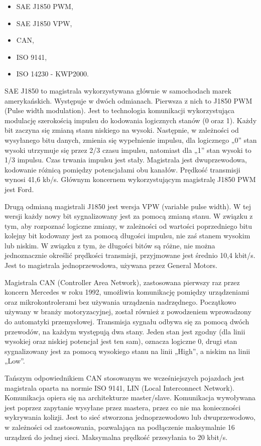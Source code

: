 \documentclass[12pt]{article} %
\numberwithin{equation}{subsection}
\numberwithin{figure}{section}
\numberwithin{table}{section}
\begin{document}
		\begin{itemize}
			\item{SAE J1850 PWM,}
			\item{SAE J1850 VPW,}
			\item{CAN,}
			\item{ISO 9141,}
			\item{ISO 14230 - KWP2000.}
		\end{itemize}
		
		SAE  J1850 to  magistrala wykorzystywana głównie w samochodach marek amerykańskich. Występuje w dwóch odmianach. Pierwsza z nich to J1850 PWM (Pulse width modulation). Jest to technologia komunikacji wykorzystująca modulację szerokością impulsu do kodowania logicznych stanów (0 oraz 1). Każdy bit zaczyna się zmianą stanu niskiego na wysoki. Następnie, w zależności od wysyłanego bitu danych, zmienia się wypełnienie impulsu, dla logicznego „0” stan wysoki utrzymuje się przez 2/3 czasu impulsu, natomiast dla „1” stan wysoki to 1/3 impulsu. Czas trwania impulsu jest stały. Magistrala jest dwuprzewodowa, kodowanie różnicą pomiędzy potencjałami obu kanałów. Prędkość transmisji wynosi 41,6 kb/s. Głównym koncernem wykorzystującym magistralę J1850 PWM jest Ford.
		
		\newpage
		
		Drugą odmianą magistrali J1850 jest wersja VPW (variable pulse width). W tej wersji każdy nowy bit sygnalizowany jest za pomocą zmianą stanu. W związku z tym, aby rozpoznać logiczne zmiany, w zależności od wartości poprzedniego bitu kolejny bit kodowany jest za pomocą długości impulsu, nie zaś stanem wysokim lub niskim.  W związku z tym, że długości bitów są różne,  nie można jednoznacznie określić prędkości transmisji, przyjmowane jest średnio 10,4 kbit/s. Jest to magistrala jednoprzewodowa, używana przez General Motors.
		
		Magistrala CAN (Controller Area Network), zastosowana pierwszy raz przez koncern Mercedes w roku 1992,  umożliwia komunikację pomiędzy urządzeniami oraz mikrokontrolerami bez używania urządzenia nadrzędnego.  Początkowo używany w branży motoryzacyjnej, został również z powodzeniem wprowadzony do automatyki przemysłowej. Transmisja sygnału odbywa się za pomocą dwóch przewodów, na każdym występują dwa stany. Jeden stan jest zgodny (dla linii wysokiej oraz niskiej potencjał jest ten sam), oznacza logiczne 0, drugi stan sygnalizowany jest za pomocą wysokiego stanu na linii „High”, a niskim na linii „Low”. 
		
		Tańszym odpowiednikiem CAN stosowanym we wcześniejszych pojazdach jest magistrala oparta na normie ISO 9141,  LIN (Local Interconnect Network).  Komunikacja opiera się na architekturze master/slave. Komunikacja wywoływana jest poprzez zapytanie wysyłane przez mastera, przez co nie ma konieczności wykrywania kolizji. Jest to sieć stworzona jednoprzewodowo lub dwuprzewodowo, w zależności od zastosowania, pozwalająca na podłączenie maksymalnie 16 urządzeń do jednej sieci. Maksymalna prędkość przesyłania to 20 kbit/s.
		
\end{document}
